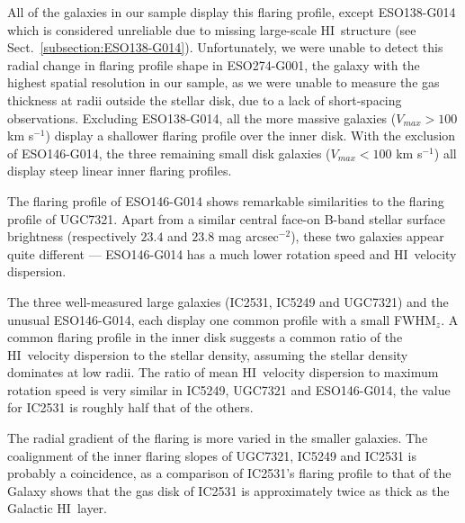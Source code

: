 \documentclass[traditabstract]{aa} %
\newcommand\HI{H{\small I}}
\newcommand\kms{km s$^{-1}$}
\newcommand\magarcsecsq{mag arcsec$^{-2}$}
\begin{document}
All of the galaxies in our sample display this flaring profile, except 
ESO138-G014 which is considered unreliable due to missing large-scale \HI\ structure 
(see Sect.~\ref{subsection:ESO138-G014}).
Unfortunately, we were unable to detect this radial change in flaring profile shape in 
ESO274-G001, the galaxy with the highest spatial resolution in our sample, as we 
were unable to measure the gas thickness at radii outside the stellar disk, due to a lack of 
short-spacing observations. Excluding ESO138-G014, all the more
massive galaxies ($V_{max} > 100$ \kms) display a shallower flaring
profile over the inner disk. With the exclusion of ESO146-G014, the
three remaining small disk galaxies ($V_{max} < 100$ \kms) all display
steep linear inner flaring profiles. 

The flaring profile of ESO146-G014 shows remarkable similarities to the 
flaring profile of UGC7321. Apart from a similar central face-on B-band stellar
surface brightness (respectively $23.4$ and $23.8$
\magarcsecsq), these two galaxies appear quite different --- ESO146-G014 has a much lower rotation speed and \HI\ velocity dispersion.

The three well-measured large
galaxies (IC2531, IC5249 and UGC7321) and the unusual ESO146-G014,
each display one common profile with a small FWHM$_z$. A
common flaring profile in the inner disk suggests a common ratio of
the \HI\ velocity dispersion to the stellar density, assuming the
stellar density dominates at low radii. The ratio of mean \HI\ velocity
dispersion to maximum rotation speed is very similar in IC5249,
UGC7321 and ESO146-G014, the value for IC2531 is roughly half that of
the others.

The radial gradient of the flaring is more varied in the smaller
galaxies. The coalignment of the inner flaring slopes of UGC7321,
IC5249 and IC2531 is probably a coincidence, as a comparison of
IC2531's flaring profile to that of the Galaxy \citep{om2000} shows
that the gas disk of IC2531 is approximately twice as thick as the
Galactic \HI\ layer.
\end{document}
